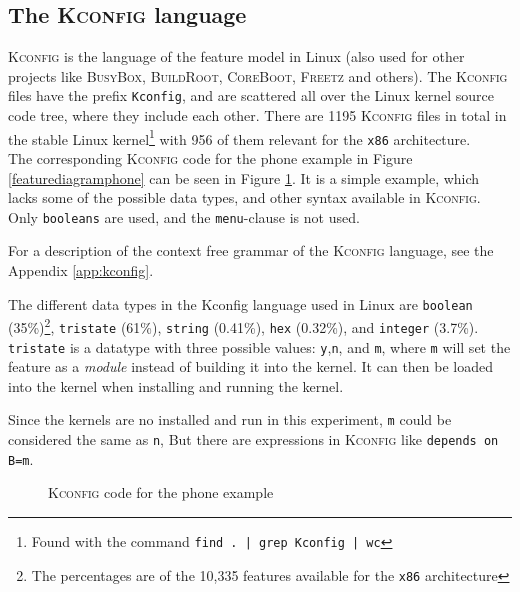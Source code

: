 \documentclass[a4paper,11pt]{report}
\newcommand{\f}{\footnote{\fn}}
\newcommand{\textcode}[1]{\fboxsep=1pt\texttt{\colorbox{gray!20}{#1}}}
\newcommand{\figa}{
    \begin{figure}[!htpb]
    \centering
}
\newcommand{\figb}[2]{
    \caption{#1}
    \label{#2}
    \end{figure}
}
\begin{document}
            \subsection{The \textsc{Kconfig} language} 

            \def \fn{Found with the command \textcode{find .\ | grep Kconfig | wc}}

\textsc{Kconfig} is the language of the feature model in Linux (also used for 
other projects like \textsc{BusyBox}, \textsc{BuildRoot}, \textsc{CoreBoot}, 
\textsc{Freetz} and others)\cite[p. 4]{VarModSSD}.  The \textsc{Kconfig} files have the prefix \textcode{Kconfig}, and are 
scattered all over the Linux kernel source code tree, where they include each 
other. There are 1195 \textsc{Kconfig} files in total in the stable Linux kernel\f
with 956 of them relevant for the \texttt{x86} architecture.
\\

The corresponding \textsc{Kconfig} code for the phone example in Figure 
\ref{featurediagramphone} can be seen in Figure \ref{kconfigphone}. It 
is a simple example, which lacks some of the possible data types, and other 
syntax available in \textsc{Kconfig}. Only \texttt{booleans} are used, and the \textcode{menu}-clause is not used.

For a description of the context free grammar of 
the \textsc{Kconfig} language, see the Appendix \ref{app:kconfig}.
\\

            \def \fn {The percentages are of the 10,335 features available for 
                the \texttt{x86} architecture}

The different data types in the Kconfig language used in Linux are 
\textcode{boolean} (35\%)\f, 
\textcode{tristate} (61\%), \textcode{string} (0.41\%), \textcode{hex} 
(0.32\%), and \textcode{integer} (3.7\%). \texttt{tristate} is a datatype 
with three possible values: \texttt{y},\texttt{n}, and \texttt{m}, where 
\texttt{m} will set the feature as a \emph{module} instead of building it into the 
kernel. It can then be loaded into the kernel when installing and running the 
kernel.

Since the kernels are no installed and run in this experiment, \texttt{m} could be considered the same as \texttt{n}, But there are 
expressions in \textsc{Kconfig} like \textcode{depends on B=m}. 



\figa
    \subfigure{
        
    }
\figb{\textsc{Kconfig} code for the phone example}{kconfigphone}
\end{document}

